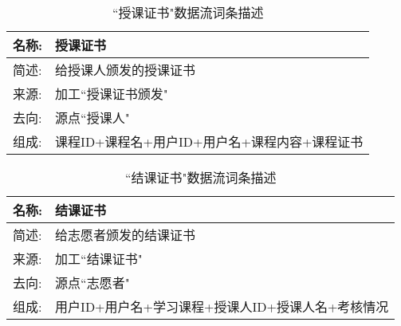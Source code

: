 \begin{table}[H]  
\caption{``授课证书"数据流词条描述}  
\begin{center}  
    \begin{tabular}{l p{11cm}}
        \hline
        \quad 名称:   & 授课证书 \\
        \hline
        \quad 简述:  & 给授课人颁发的授课证书 \\
        \hline
        \quad 来源:  & 加工``授课证书颁发" \\
        \hline
        \quad 去向:  & 源点``授课人" \\
        \hline
        \quad 组成:  & 课程ID+课程名+用户ID+用户名+课程内容+课程证书 \\
        \hline
    \end{tabular}
    \label{tab1}
\end{center}
\end{table}

\begin{table}[H]  
\caption{``结课证书"数据流词条描述}  
\begin{center}  
    \begin{tabular}{l p{11cm}} 
        \hline
        \quad 名称:    & 结课证书 \\
        \hline
        \quad 简述:  & 给志愿者颁发的结课证书 \\
        \hline
        \quad 来源:  & 加工``结课证书" \\
        \hline
        \quad 去向:  & 源点``志愿者" \\
        \hline
        \quad 组成:  &  用户ID+用户名+学习课程+授课人ID+授课人名+考核情况 \\
        \hline
    \end{tabular}
    \label{tab1}
\end{center}
\end{table}